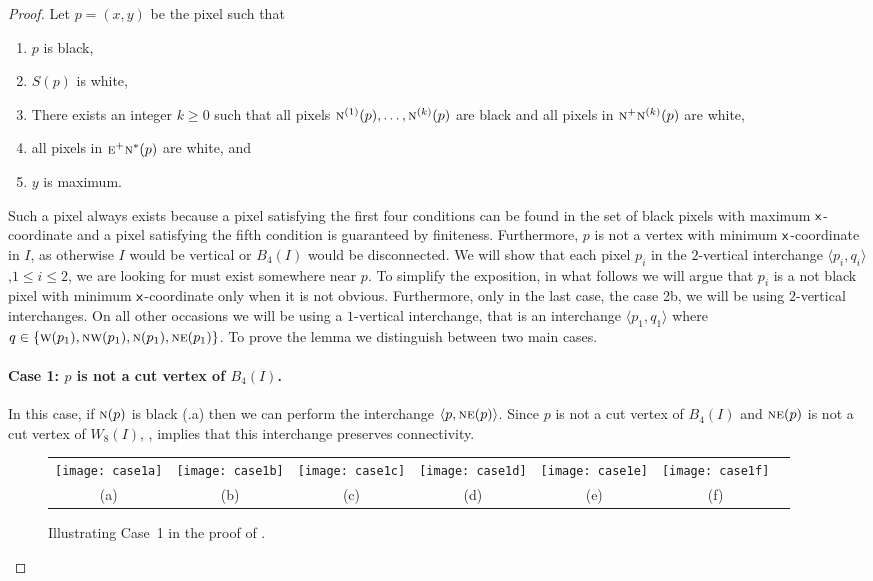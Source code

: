 \documentclass[lotsofwhite,charterfonts]{patmorin}
\newcommand{\N}{\textsc{n}}
\newcommand{\NE}{\textsc{ne}}
\newcommand{\E}{\textsc{e}}
\newcommand{\W}{\textsc{w}}
\newcommand{\NW}{\textsc{nw}}
\newcommand{\x}{\ensuremath{\protect\textup{\textsf{x}}}}
\newcommand{\ic}[2]{\langle #1,#2 \rangle}
\begin{document}
\begin{proof}
Let $p=(x,y)$ be the pixel such that
\begin{enumerate}
  \item $p$ is black, 
  \item $S(p)$ is white,
  \item There exists an integer $k\ge 0$ such that all pixels
	$\N^{(1)}(p),\ldots,\N^{(k)}(p)$ are black and 
        all pixels in $\N^{+}\N^{(k)}(p)$ are white,
  \item all pixels in $\E^+\N^*(p)$ are white, and
  \item $y$ is maximum.
\end{enumerate}
Such a pixel always exists because a pixel satisfying the first four conditions can be found in the set of black pixels with maximum \x-coordinate and a pixel satisfying the fifth condition is guaranteed by finiteness. Furthermore, $p$ is not a vertex with minimum \x-coordinate in $I$, as otherwise $I$ would be vertical or $B_4(I)$ would be disconnected. We will show that each pixel $p_i$ in the $2$-vertical interchange $\ic{p_i}{q_i}$,$1\leq i\leq 2$,  we are looking for must exist somewhere near $p$. To simplify the exposition, in what follows we will argue that $p_i$ is a not black pixel with minimum \x-coordinate only when it is not obvious. Furthermore, only in the last case, the case 2b, we will be using $2$-vertical interchanges. On all other occasions we will be using a $1$-vertical interchange, that is an interchange $\ic{p_1}{q_1}$ where $q\in\{\W(p_1),\NW(p_1),\N(p_1),\NE(p_1)\}$. To prove the lemma we distinguish between two main cases.


\paragraph{Case 1: $p$ is not a cut vertex of $B_4(I)$.}  In this
case, if $\N(p)$ is black (.a) then we can perform
the interchange $\ic{p}{\NE(p)}$.  Since $p$ is not a cut vertex of
$B_4(I)$ and $\NE(p)$ is not a cut vertex of $W_8(I)$,
, implies that this interchange preserves
connectivity.

\begin{figure}[htbp]
\begin{center}
\begin{tabular}{ccccccc}
\texttt{[image: case1a]} & 
\texttt{[image: case1b]} & 
\texttt{[image: case1c]} & 
\texttt{[image: case1d]} & 
\texttt{[image: case1e]} & 
\texttt{[image: case1f]} \\
(a) & (b) & (c) & (d) & (e) & (f)
\end{tabular}
\end{center}
\caption{Illustrating Case~1 in the proof of .}
\end{figure}



\end{proof}
\end{document}
